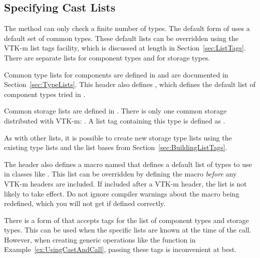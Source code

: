 \subsection{Specifying Cast Lists}
\label{sec:DynamicArrayHandleSpecifyingCastLists}

The  method can only check a finite number of types.
The default form of  uses a default set of common
types. These default lists can be overridden using the VTK-m list tags
facility, which is discussed at length in Section~\ref{sec:ListTags}. There
are separate lists for component types and for storage types.

Common type lists for components are defined in
 and are documented in
Section~\ref{sec:TypeLists}. This header also defines
, which defines the default list
of component types tried in .


Common storage lists are defined in
. There is only one common storage
distributed with VTK-m: . A list tag
containing this type is defined as .

As with other lists, it is possible to create new storage type lists
using the existing type lists and the list bases from
Section~\ref{sec:BuildingListTags}.

The  header also defines a macro
named  that defines a
default list of types to use in classes like
. This list can be overridden by
defining the  macro
\emph{before} any VTK-m headers are included. If included after a VTK-m
header, the list is not likely to take effect. Do not ignore compiler
warnings about the macro being redefined, which you will not get if defined
correctly.


There is a form of  that accepts tags for the list of
component types and storage types. This can be used when the specific
lists are known at the time of the call. However, when creating generic
operations like the  function in
Example~\ref{ex:UsingCastAndCall}, passing these tags is inconvenient at
best.

